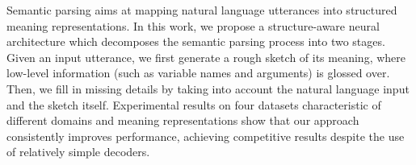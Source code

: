Semantic parsing aims at mapping natural language utterances into structured meaning representations. In this work, we propose a structure-aware neural architecture which decomposes the semantic parsing process into two stages. Given an input utterance, we first generate a rough sketch of its meaning, where low-level information (such as variable names and arguments) is glossed over. Then, we fill in missing details by taking into account the natural language input and the sketch itself. Experimental results on four datasets characteristic of different domains and meaning representations show that our approach consistently improves performance, achieving competitive results despite the use of relatively simple decoders.
